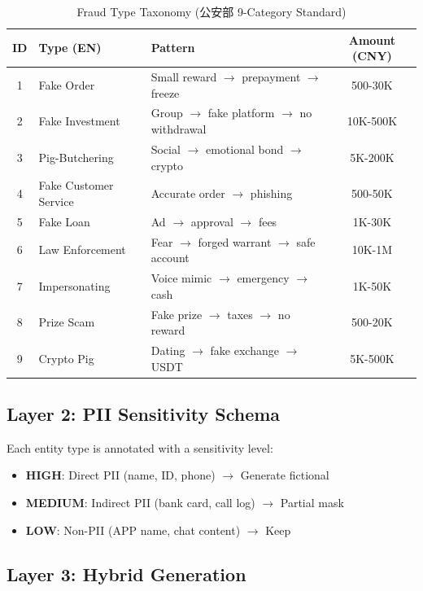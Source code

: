 \documentclass[letterpaper]{article}
\begin{document}
\begin{table}[h]
\centering
\caption{Fraud Type Taxonomy (公安部 9-Category Standard)}
\label{tab:fraud_types}
\begin{tabular}{cllc}
\toprule
ID & Type (EN) & Pattern & Amount (CNY) \\
\midrule
1 & Fake Order & Small reward $\rightarrow$ prepayment $\rightarrow$ freeze & 500-30K \\
2 & Fake Investment & Group $\rightarrow$ fake platform $\rightarrow$ no withdrawal & 10K-500K \\
3 & Pig-Butchering & Social $\rightarrow$ emotional bond $\rightarrow$ crypto & 5K-200K \\
4 & Fake Customer Service & Accurate order $\rightarrow$ phishing & 500-50K \\
5 & Fake Loan & Ad $\rightarrow$ approval $\rightarrow$ fees & 1K-30K \\
6 & Law Enforcement & Fear $\rightarrow$ forged warrant $\rightarrow$ safe account & 10K-1M \\
7 & Impersonating & Voice mimic $\rightarrow$ emergency $\rightarrow$ cash & 1K-50K \\
8 & Prize Scam & Fake prize $\rightarrow$ taxes $\rightarrow$ no reward & 500-20K \\
9 & Crypto Pig & Dating $\rightarrow$ fake exchange $\rightarrow$ USDT & 5K-500K \\
\bottomrule
\end{tabular}
\end{table}

\subsection{Layer 2: PII Sensitivity Schema}

Each entity type is annotated with a sensitivity level:
\begin{itemize}
    \item \textbf{HIGH}: Direct PII (name, ID, phone) $\rightarrow$ Generate fictional
    \item \textbf{MEDIUM}: Indirect PII (bank card, call log) $\rightarrow$ Partial mask
    \item \textbf{LOW}: Non-PII (APP name, chat content) $\rightarrow$ Keep
\end{itemize}

\subsection{Layer 3: Hybrid Generation}
\end{document}
